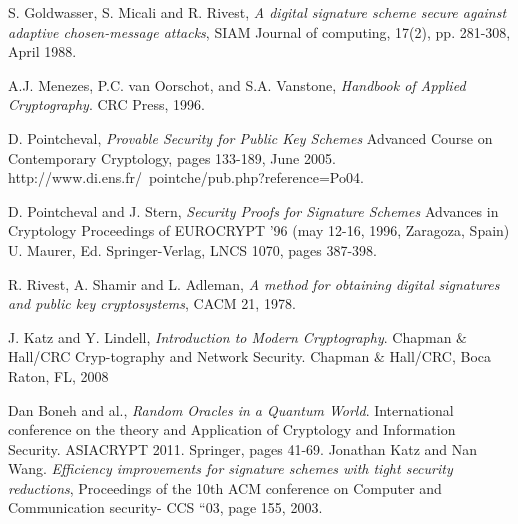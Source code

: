 \documentclass[a4paper,11pt]{article}
\begin{document}
\begin{thebibliography}{10}
 S. Goldwasser, S. Micali and R. Rivest, \emph{A digital signature scheme secure against
adaptive chosen-message attacks}, SIAM Journal of computing, 17(2), pp. 281-308, April 1988.

 A.J. Menezes, P.C. van Oorschot, and S.A. Vanstone, \emph{Handbook of Applied Cryptography}. CRC Press, 1996.

 D. Pointcheval, \emph{Provable Security for Public Key Schemes} Advanced Course on Contemporary Cryptology, pages 133-189, June 2005. http://www.di.ens.fr/~pointche/pub.php?reference=Po04.


 D. Pointcheval and J. Stern, \emph{Security Proofs for Signature Schemes} Advances in Cryptology  Proceedings of EUROCRYPT '96 (may 12-16, 1996, Zaragoza, Spain) U. Maurer, Ed. Springer-Verlag, LNCS 1070, pages 387-398.

 R. Rivest, A. Shamir and L. Adleman, \emph{A method for obtaining digital signatures and public key cryptosystems}, CACM 21, 1978.

 J. Katz and Y. Lindell, \emph{Introduction to Modern Cryptography}. Chapman $\&$ Hall/CRC Cryp-tography and Network Security. Chapman $\&$ Hall/CRC, Boca Raton, FL, 2008

Dan Boneh and al.,
\emph{Random Oracles in a Quantum World}.
International conference on the theory and Application of Cryptology and Information Security. ASIACRYPT 2011. Springer, pages 41-69.
Jonathan Katz and Nan Wang.
\emph{Efficiency improvements for signature schemes with tight security reductions}, Proceedings of the 10th ACM conference on Computer and Communication security- CCS ``03, page 155, 2003.
\end{thebibliography}
\end{document}
